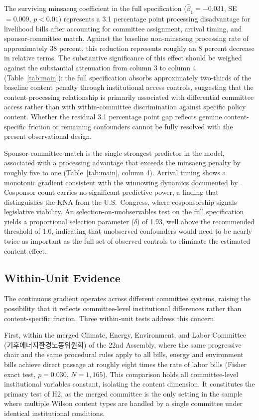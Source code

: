 \documentclass[11pt]{article}
\begin{document}
The surviving minsaeng coefficient in the full specification ($\hat{\beta}_1 = -0.031$, SE $= 0.009$, $p < 0.01$) represents a 3.1 percentage point processing disadvantage for livelihood bills after accounting for committee assignment, arrival timing, and sponsor-committee match. Against the baseline non-minsaeng processing rate of approximately 38 percent, this reduction represents roughly an 8 percent decrease in relative terms. The substantive significance of this effect should be weighed against the substantial attenuation from column 3 to column 4 (Table~\ref{tab:main}): the full specification absorbs approximately two-thirds of the baseline content penalty through institutional access controls, suggesting that the content-processing relationship is primarily associated with differential committee access rather than with within-committee discrimination against specific policy content. Whether the residual 3.1 percentage point gap reflects genuine content-specific friction or remaining confounders cannot be fully resolved with the present observational design.

Sponsor-committee match is the single strongest predictor in the model, associated with a processing advantage that exceeds the minsaeng penalty by roughly five to one (Table~\ref{tab:main}, column 4). Arrival timing shows a monotonic gradient consistent with the winnowing dynamics documented by \citet{krutz2005}. Cosponsor count carries no significant predictive power, a finding that distinguishes the KNA from the U.S.\ Congress, where cosponsorship signals legislative viability. An \citet{oster2019} selection-on-unobservables test on the full specification yields a proportional selection parameter ($\delta$) of 1.93, well above the recommended threshold of 1.0, indicating that unobserved confounders would need to be nearly twice as important as the full set of observed controls to eliminate the estimated content effect.

\subsection{Within-Unit Evidence}

The continuous gradient operates across different committee systems, raising the possibility that it reflects committee-level institutional differences rather than content-specific friction. Three within-unit tests address this concern.

First, within the merged Climate, Energy, Environment, and Labor Committee (기후에너지환경노동위원회) of the 22nd Assembly, where the same progressive chair and the same procedural rules apply to all bills, energy and environment bills achieve direct passage at roughly eight times the rate of labor bills (Fisher exact test, $p = 0.030$, $N = 1{,}165$). This comparison holds all committee-level institutional variables constant, isolating the content dimension. It constitutes the primary test of H2, as the merged committee is the only setting in the sample where multiple Wilson content types are handled by a single committee under identical institutional conditions.
\end{document}
